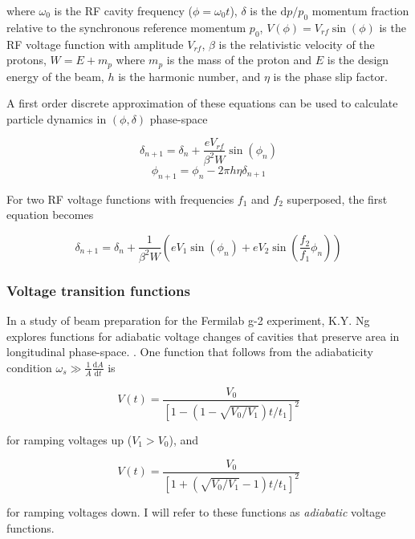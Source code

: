 where $\omega_0$ is the RF cavity frequency ($\phi = \omega_0 t$),
$\delta$ is the $\mathrm{d}p/p_0$ momentum fraction relative to the
synchronous reference momentum $p_0$, $V(\phi) = V_{rf}\sin(\phi)$ is
the RF voltage function with amplitude $V_{rf}$, $\beta$ is the
relativistic velocity of the protons, $W = E + m_p$ where $m_p$ is the
mass of the proton and $E$ is the design energy of the beam, $h$ is
the harmonic number, and $\eta$ is the phase slip factor.

A first order discrete approximation of these equations can be used to
calculate particle dynamics in $(\phi, \delta)$ phase-space

\begin{equation}
\delta_{n+1} = \delta_n +  \frac{e V_{rf}}{\beta ^2 W}\sin(\phi_n) 
\end{equation}
\begin{equation}
\phi_{n+1} = \phi_n - 2\pi h \eta \delta_{n+1} 
\end{equation}

For two RF voltage functions with frequencies $f_{1}$ and $f_{2}$
superposed, the first equation becomes

\begin{equation}
\delta_{n+1} = \delta_n +  \frac{1}{\beta ^2 W}(eV_{1}\sin(\phi_n) + eV_{2}\sin(\frac{f_2}{f_1}\phi_n)) 
\end{equation}

\subsubsection{Voltage transition functions}

In a study of beam preparation for the Fermilab g-2 experiment,
K.Y. Ng explores functions for adiabatic voltage changes of cavities
that preserve area in longitudinal
phase-space. \cite{adiabatic_capture}. One function that follows from
the adiabaticity condition $\omega_s \gg \frac{1}{A} \frac{\mathrm{d}
  A}{\mathrm{d}t}$ is

\begin{equation}
V(t) = \frac{V_0}{[1 - (1 - \sqrt{V_0/V_1})t/t_1]^2}
\end{equation}

for ramping voltages up ($V_1 > V_0$), and 

\begin{equation}
V(t) = \frac{V_0}{[1 + (\sqrt{V_0/V_1} - 1)t/t_1]^2}
\end{equation}

for ramping voltages down. I will refer to these functions as
\textit{adiabatic} voltage functions.

